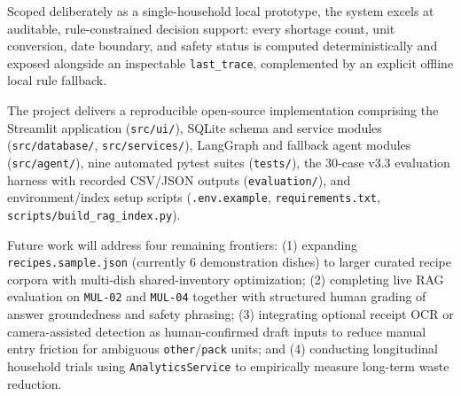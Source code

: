 \documentclass[conference]{IEEEtran}
\begin{document}
Scoped deliberately as a single-household local prototype, the system excels at auditable, rule-constrained decision support: every shortage count, unit conversion, date boundary, and safety status is computed deterministically and exposed alongside an inspectable \texttt{last\_trace}, complemented by an explicit offline local rule fallback.

The project delivers a reproducible open-source implementation comprising the Streamlit application (\texttt{src/ui/}), SQLite schema and service modules (\texttt{src/database/}, \texttt{src/services/}), LangGraph and fallback agent modules (\texttt{src/agent/}), nine automated pytest suites (\texttt{tests/}), the 30-case v3.3 evaluation harness with recorded CSV/JSON outputs (\texttt{evaluation/}), and environment/index setup scripts (\texttt{.env.example}, \texttt{requirements.txt}, \texttt{scripts/build\_rag\_index.py}).

Future work will address four remaining frontiers: (1) expanding \texttt{recipes.sample.json} (currently 6 demonstration dishes) to larger curated recipe corpora with multi-dish shared-inventory optimization; (2) completing live RAG evaluation on \texttt{MUL-02} and \texttt{MUL-04} together with structured human grading of answer groundedness and safety phrasing; (3) integrating optional receipt OCR or camera-assisted detection as human-confirmed draft inputs to reduce manual entry friction for ambiguous \texttt{other}/\texttt{pack} units; and (4) conducting longitudinal household trials using \texttt{AnalyticsService} to empirically measure long-term waste reduction.
\end{document}
